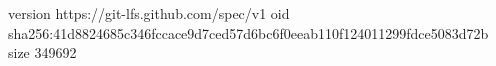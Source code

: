 version https://git-lfs.github.com/spec/v1
oid sha256:41d8824685c346fccace9d7ced57d6bc6f0eeab110f124011299fdce5083d72b
size 349692
